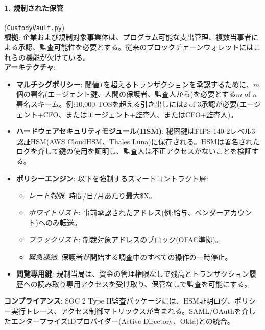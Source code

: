 \documentclass[11pt]{article}
\begin{document}
\paragraph{1. 規制された保管} (\texttt{CustodyVault.py})\\
\textbf{根拠}: 企業および規制対象事業体は、プログラム可能な支出管理、複数当事者による承認、監査可能性を必要とする。従来のブロックチェーンウォレットにはこれらの機能が欠けている。\\
\textbf{アーキテクチャ}:
\begin{itemize}[noitemsep]
  \item \textbf{マルチシグポリシー}: 閾値$T$を超えるトランザクションを承認するために、$m$個の署名(エージェント鍵、人間の保護者、監査人から)を必要とする$m$-of-$n$署名スキーム。例:10,000 TOSを超える引き出しには2-of-3承認が必要(エージェント+CFO、またはエージェント+監査人、またはCFO+監査人)。
  \item \textbf{ハードウェアセキュリティモジュール(HSM)}: 秘密鍵はFIPS 140-2レベル3認証HSM(AWS CloudHSM、Thales Luna)に保存される。HSMは署名されたログを介して鍵の使用を証明し、監査人は不正アクセスがないことを検証する。
  \item \textbf{ポリシーエンジン}: 以下を強制するスマートコントラクト層:
    \begin{itemize}[noitemsep]
      \item \emph{レート制限}: 時間/日/月あたり最大\$X。
      \item \emph{ホワイトリスト}: 事前承認されたアドレス(例:給与、ベンダーアカウント)へのみ転送。
      \item \emph{ブラックリスト}: 制裁対象アドレスのブロック(OFAC準拠)。
      \item \emph{緊急凍結}: 保護者が開始する調査中のすべての操作の一時停止。
    \end{itemize}
  \item \textbf{閲覧専用鍵}: 規制当局は、資金の管理権限なしで残高とトランザクション履歴への読み取り専用アクセスを受け取り、保管なしで監査を可能にする。
\end{itemize}
\textbf{コンプライアンス}: SOC 2 Type II監査パッケージには、HSM証明ログ、ポリシー実行トレース、アクセス制御マトリックスが含まれる。SAML/OAuthを介したエンタープライズIDプロバイダー(Active Directory、Okta)との統合。
\end{document}
